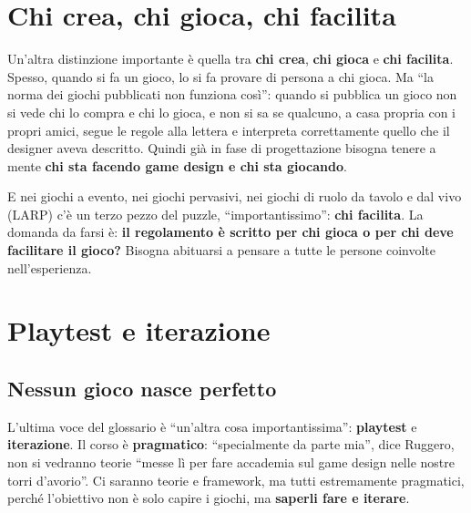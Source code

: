 \section{Chi crea, chi gioca, chi facilita}
\label{a1:sec:ruoli-esperienza}



Un'altra distinzione importante è quella tra \textbf{chi crea}, \textbf{chi
gioca} e \textbf{chi facilita}. Spesso, quando si fa un gioco, lo si fa provare
di persona a chi gioca. Ma ``la norma dei giochi pubblicati non funziona così'':
quando si pubblica un gioco non si vede chi lo compra e chi lo gioca, e non si
sa se qualcuno, a casa propria con i propri amici, segue le regole alla lettera e
interpreta correttamente quello che il designer aveva descritto. Quindi già in
fase di progettazione bisogna tenere a mente \textbf{chi sta facendo game design
e chi sta giocando}.

E nei giochi a evento, nei giochi pervasivi, nei giochi di ruolo da tavolo e dal
vivo (LARP) c'è un terzo pezzo del puzzle, ``importantissimo'': \textbf{chi
facilita}. La domanda da farsi è: \textbf{il regolamento è scritto per chi gioca
o per chi deve facilitare il gioco?} Bisogna abituarsi a pensare a tutte le
persone coinvolte nell'esperienza.

\section{Playtest e iterazione}
\label{a1:sec:playtest}

\subsection{Nessun gioco nasce perfetto}



L'ultima voce del glossario è ``un'altra cosa importantissima'':
\textbf{playtest} e \textbf{iterazione}. Il corso è \textbf{pragmatico}:
``specialmente da parte mia'', dice Ruggero, non si vedranno teorie ``messe lì
per fare accademia sul game design nelle nostre torri d'avorio''. Ci saranno
teorie e framework, ma tutti estremamente pragmatici, perché l'obiettivo non è
solo capire i giochi, ma \textbf{saperli fare e iterare}.

